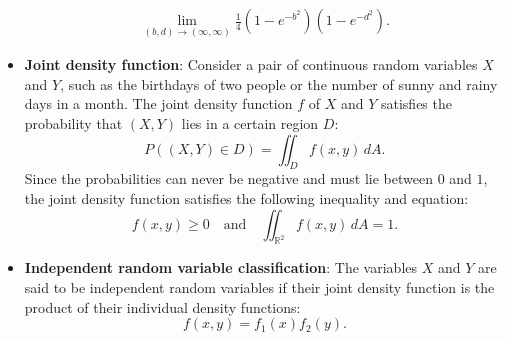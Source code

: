 \documentclass{report}
\begin{document}
\begin{itemize}
            \begin{align*}
                \lim\limits_{(b,d) \to (\infty,\infty)}{\frac{1}{4}(1-e^{-b^{2}})(1-e^{-d^{2}})}
            .\end{align*}
        \item \textbf{Joint density function}:
            Consider a pair of continuous random variables \(X\) and \(Y\), such as the birthdays of two people or the number of sunny and rainy days in a month. The joint density function \(f\) of \(X\) and \(Y\) satisfies the probability that \((X,Y)\) lies in a certain region \(D\):
            \[
                P((X,Y) \in D) = \iint_D f(x,y) \, dA.
            \]
            Since the probabilities can never be negative and must lie between \(0\) and \(1\), the joint density function satisfies the following inequality and equation:
            \[
                f(x,y) \geq 0 \quad \text{and} \quad \iint_{\mathbb{R}^2} f(x,y) \, dA = 1.
            \]
        \item \textbf{Independent random variable classification}:
            The variables \(X\) and \(Y\) are said to be independent random variables if their joint density function is the product of their individual density functions:
            \[
                f(x,y) = f_1(x) f_2(y).
            \]


\end{itemize}
\end{document}
